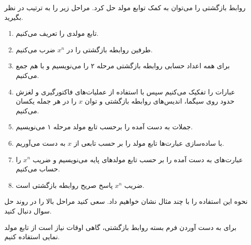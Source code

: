 \p
روابط بازگشتی را می‌توان به کمک توابع مولد حل کرد.
مراحل زیر را به ترتیب در نظر بگیرید.
\begin{enumerate}[label=\arabic*)]
    \item تابع مولدی را تعریف می‌کنیم.
    \item طرفین روابطه بازگشتی را در $x^n$ ضرب می‌کنیم.
    \item برای همه اعداد حسابی روابطه بازگشتی مرحله ۲ را می‌نویسیم و با هم جمع می‌کنیم.
    \item عبارات را تفکیک می‌کنیم سپس با استفاده از عملیات‌های فاکتورگیری و لغزش حدود روی سیگما، اندیس‌های روابطه بازگشتی و توان $x$ را در هر جمله یکسان می‌کنیم.
    \item جملات به دست آمده را برحسب تابع مولد مرحله ۱ می‌نویسیم.
    \item با ساده‌سازی عبارت‌ها تابع مولد را بر حسب تابعی از $x$ به دست می‌آوریم.
    \item عبارت‌های به دست آمده را بر حسب تابع مولد‌های پایه می‌نویسیم و ضریب $x^n$ را حساب می‌کنیم.
    \item ضریب $x^n$ پاسخ صریح روابطه بازگشتی است.
\end{enumerate}
نحوه این استفاده را با چند مثال نشان خواهیم داد.
سعی کنید مراحل بالا را در روند حل سوال دنبال کنید.




\p
برای به دست آوردن فرم بسته روابط بازگشتی، گاهی اوقات نیاز است از تابع مولد نمایی استفاده کنیم.

